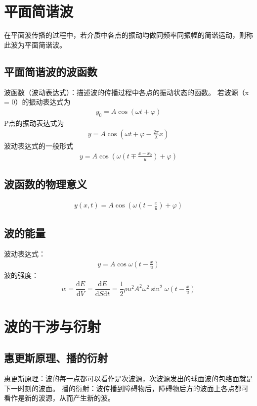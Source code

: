 \documentclass[12pt, a4paper, oneside]{ctexbook}
\begin{document}
\section{平面简谐波}
在平面波传播的过程中，若介质中各点的振动均做同频率同振幅的简谐运动，则称此波为平面简谐波。
\subsection{平面简谐波的波函数}
波函数（波动表达式）：描述波的传播过程中各点的振动状态的函数。
若波源（x = 0）的振动表达式为
\begin{align*}
    y_0 = A\cos{(\omega t + \varphi)}
\end{align*}
P点的振动表达式为
\begin{align*}
    y = A\cos{(\omega t + \varphi - \frac{2\pi}{\lambda}x)}
\end{align*}
波动表达式的一般形式
\begin{align*}
    y = A\cos{(\omega (t \mp \frac{x - x_0}{u}) + \varphi)}
\end{align*}

\subsection{波函数的物理意义}
\begin{align*}
    y(x,t) = A\cos{(\omega (t  - \frac{x}{u}) + \varphi)}
\end{align*}    
 
\subsection{波的能量}
波动表达式：
\begin{align*}
    y = A\cos{\omega( t - \frac{x}{u})}
\end{align*}
波的强度：
\begin{align*}
    w = \dfrac{\mathrm{d}E}{\mathrm{d}V} = \dfrac{\mathrm{d}E}{\mathrm{d}S\mathrm{d}t} = \dfrac{1}{2}\rho u^2 A^2 \omega^2 \sin^2{\omega(t - \frac{x}{u})}
\end{align*}

\section{波的干涉与衍射}
\subsection{惠更斯原理、播的衍射}
惠更斯原理：波的每一点都可以看作是次波源，次波源发出的球面波的包络面就是下一时刻的波面。
播的衍射：波传播到障碍物后，障碍物后方的波面上各点都可看作是新的波源，从而产生新的波。
\end{document}
